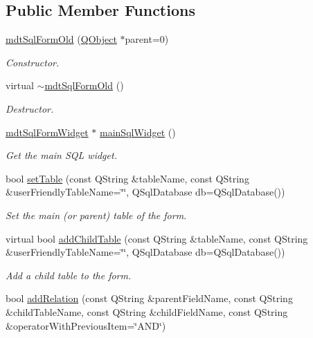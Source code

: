 \subsection*{Public Member Functions}
\begin{DoxyCompactItemize}
\item 
\hyperlink{classmdt_sql_form_old_a55ed87f44538a5da6454eadddaca141b}{mdt\-Sql\-Form\-Old} (\hyperlink{class_q_object}{Q\-Object} $\ast$parent=0)
\begin{DoxyCompactList}\small\item\em Constructor. \end{DoxyCompactList}\item 
virtual \hyperlink{classmdt_sql_form_old_ad851ab38078281361d80f733680db0d6}{$\sim$mdt\-Sql\-Form\-Old} ()
\begin{DoxyCompactList}\small\item\em Destructor. \end{DoxyCompactList}\item 
\hyperlink{classmdt_sql_form_widget}{mdt\-Sql\-Form\-Widget} $\ast$ \hyperlink{classmdt_sql_form_old_a18b6cc0c5fd84699a54f374580a2380e}{main\-Sql\-Widget} ()
\begin{DoxyCompactList}\small\item\em Get the main S\-Q\-L widget. \end{DoxyCompactList}\item 
bool \hyperlink{classmdt_sql_form_old_af9be4e55bac675a073aa5eb0d442e86d}{set\-Table} (const Q\-String \&table\-Name, const Q\-String \&user\-Friendly\-Table\-Name=\char`\"{}\char`\"{}, Q\-Sql\-Database db=Q\-Sql\-Database())
\begin{DoxyCompactList}\small\item\em Set the main (or parent) table of the form. \end{DoxyCompactList}\item 
virtual bool \hyperlink{classmdt_sql_form_old_a7a6e64996d14615b449b42969f5a845d}{add\-Child\-Table} (const Q\-String \&table\-Name, const Q\-String \&user\-Friendly\-Table\-Name=\char`\"{}\char`\"{}, Q\-Sql\-Database db=Q\-Sql\-Database())
\begin{DoxyCompactList}\small\item\em Add a child table to the form. \end{DoxyCompactList}\item 
bool \hyperlink{classmdt_sql_form_old_a2817d3049b86ba6bccabd41bc32c7706}{add\-Relation} (const Q\-String \&parent\-Field\-Name, const Q\-String \&child\-Table\-Name, const Q\-String \&child\-Field\-Name, const Q\-String \&operator\-With\-Previous\-Item=\char`\"{}A\-N\-D\char`\"{})

\end{DoxyCompactItemize}
